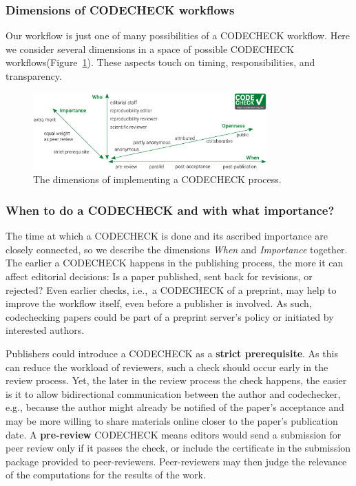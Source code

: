 \documentclass[12pt]{article}
\begin{document}
\subsubsection*{Dimensions of CODECHECK workflows}\label{dimensions-of-workflows}

Our workflow is just one of many possibilities of a CODECHECK
workflow.  Here we consider several dimensions in a space of possible
CODECHECK workflows(Figure~\ref{fig:dimensions}).  These aspects touch
on timing, responsibilities, and transparency.

\begin{figure}
  \centering
      \includegraphics[width=0.8\textwidth]{figs/codecheck_dimensions.pdf}
  \caption{The dimensions of implementing a CODECHECK process.}
  \label{fig:dimensions}
\end{figure}

\subsubsection*{When to do a CODECHECK and with what importance?}
\label{when-to-do-a-codecheck}

The time at which a CODECHECK is done and its ascribed importance are
closely connected, so we describe the dimensions \emph{When} and
\emph{Importance} together.  The earlier a CODECHECK happens in the
publishing process, the more it can affect editorial decisions: Is a
paper published, sent back for revisions, or rejected?  Even earlier
checks, i.e.,~a CODECHECK of a preprint, may help to improve the
workflow itself, even before a publisher is involved.  As such,
codechecking papers could be part of a preprint server's policy or
initiated by interested authors.

Publishers could introduce a CODECHECK as a \textbf{strict prerequisite}.
As this can reduce the workload of reviewers, such a check should occur early in the review process.
Yet, the later in the review process the check happens, the easier is
it to allow bidirectional communication between the author and
codechecker, e.g., because the author might already be notified of the
paper's acceptance and may be more willing to share materials online closer to the paper's publication date.
A \textbf{pre-review} CODECHECK means editors would send a submission
for peer review only if it passes the check, or include the certificate in the submission package provided to peer-reviewers.
Peer-reviewers may then judge the relevance of the computations for the results of the work.
\end{document}

